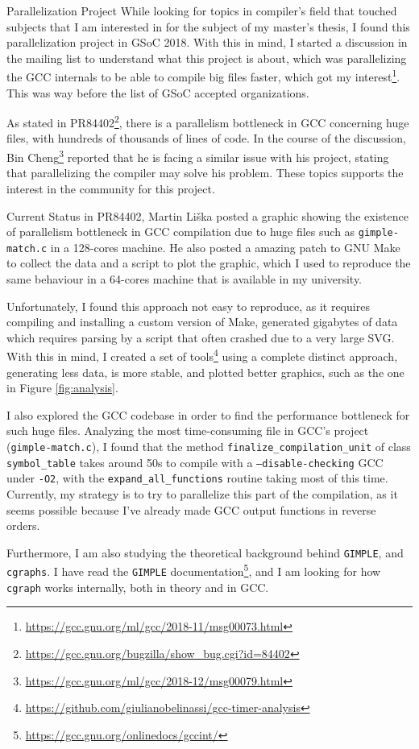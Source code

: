 \documentclass[12pt]{article}
\begin{document}
\begin{section}{Parallelization Project}
While looking for topics in compiler's field that touched subjects that I
am interested in for the subject of my master's thesis, I found this
parallelization project in GSoC 2018. With this in mind, I started a
discussion in the mailing list to understand what this project is about,
which was parallelizing the GCC internals to be able to compile big files
faster, which got my
interest\footnote{\url{https://gcc.gnu.org/ml/gcc/2018-11/msg00073.html}}.
This was way before the list of GSoC accepted organizations.

As stated in PR84402\footnote{\url{https://gcc.gnu.org/bugzilla/show\_bug.cgi?id=84402}},
there is a parallelism bottleneck in GCC concerning huge files, with hundreds of
thousands of lines of code. In the course of the discussion,
Bin Cheng\footnote{\url{https://gcc.gnu.org/ml/gcc/2018-12/msg00079.html}}
reported that
he is facing a similar issue with his project, stating that parallelizing the
compiler may solve his problem. These topics supports the interest in the
community for this project.

\end{section}

\begin{subsection}{Current Status}
in PR84402, Martin Liška posted a graphic showing the existence of
parallelism bottleneck in GCC compilation due to huge files such as
\texttt{gimple-match.c} in a 128-cores machine. He also posted a amazing patch to
GNU Make to collect the data and a script to plot the graphic, which I used
to reproduce the same behaviour in a 64-cores machine that is available in
my university.

Unfortunately, I found this approach not easy to reproduce, as
it requires compiling and installing a custom version of Make, generated
gigabytes of data which requires parsing by a script that often crashed due
to a very large SVG. With this in mind, I created a set of
tools\footnote{\url{https://github.com/giulianobelinassi/gcc-timer-analysis}}
using a complete distinct approach, generating less data, is more stable, and
plotted better graphics, such as the one in Figure \ref{fig:analysis}.

I also explored the GCC codebase in order to find the performance bottleneck for
such huge files. Analyzing the most time-consuming file in GCC's project
(\texttt{gimple-match.c}), I found that the method
\texttt{finalize\_compilation\_unit} of
class \texttt{symbol\_table} takes around 50s to compile with a
\texttt{--disable-checking} GCC under \texttt{-O2}, with the \texttt{expand\_all\_functions}
routine taking most of this time. Currently, my strategy is to try to parallelize
this part of the compilation, as it seems possible because I've already made GCC output
functions in reverse orders.

Furthermore, I am also studying the theoretical background behind \texttt{GIMPLE},
    and \texttt{cgraphs}. I have read the \texttt{GIMPLE}
documentation\footnote{\url{https://gcc.gnu.org/onlinedocs/gccint/}}, and
I am looking for how \texttt{cgraph} works internally, both in theory and in
GCC.

\end{subsection}
\end{document}
